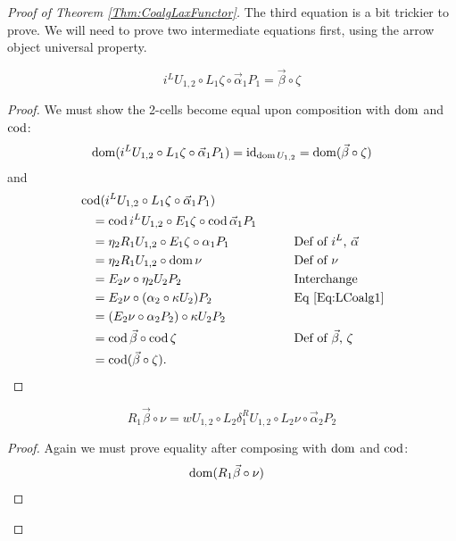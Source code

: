 \begin{proof}[Proof of Theorem \ref{Thm:CoalgLaxFunctor}]
	The third equation is a bit trickier to prove. We will need to prove two intermediate equations first, using the arrow object universal property.
	\begin{lemma*}
		\begin{equation}\label{Eq:CompLem1}
			i^LU_{1,2} \circ L_1\zeta \circ \vec{\alpha}_1P_1 = \vec{\beta}\circ\zeta
		\end{equation}
	\end{lemma*}
	\begin{proof}
		We must show the 2-cells become equal upon composition with $\operatorname{dom}$ and $\operatorname{cod}$:
		\[
			\operatorname{dom}(i^LU_{1,2} \circ L_1\zeta \circ \vec{\alpha}_1P_1) = \operatorname{id}_{\operatorname{dom} U_{1,2}} = \operatorname{dom}(\vec{\beta}\circ\zeta)
		\]
		and
		\begin{alignat*}{2}
			\hspace{1em}&\hspace{-1em} \operatorname{cod}(i^L U_{1,2} \circ L_1\zeta \circ \vec{\alpha}_1P_1) && \\
			&= \operatorname{cod} i^LU_{1,2} \circ E_1\zeta \circ \operatorname{cod}\vec{\alpha}_1P_1 &\qquad& \\
			&= \eta_2R_1U_{1,2} \circ E_1\zeta \circ \alpha_1P_1 
				&& \text{Def of $i^L$, $\vec{\alpha}$} \\
			&= \eta_2R_1U_{1,2} \circ \operatorname{dom}\nu
				&& \text{Def of $\nu$} \\
			&= E_2\nu \circ \eta_2U_2P_2
				&& \text{Interchange} \\
			&= E_2\nu \circ (\alpha_2 \circ \kappa U_2)P_2
				&& \text{Eq \eqref{Eq:LCoalg1}} \\
			&= (E_2\nu \circ \alpha_2P_2) \circ \kappa U_2P_2 && \\
			&= \operatorname{cod}\vec{\beta} \circ \operatorname{cod}\zeta
				&& \text{Def of $\vec{\beta}$, $\zeta$} \\
			&= \operatorname{cod}(\vec{\beta}\circ\zeta). &&
		\end{alignat*}
	\end{proof}
	\begin{lemma*}
		\begin{equation}\label{Eq:CompLem2}
			R_1\vec{\beta} \circ \nu = wU_{1,2} \circ L_2\delta_1^RU_{1,2} \circ L_2\nu \circ \vec{\alpha}_2P_2
		\end{equation}
	\end{lemma*}
	\begin{proof}
		Again we must prove equality after composing with $\operatorname{dom}$ and $\operatorname{cod}$:
		\begin{alignat*}{2}
			\hspace{1em}&\hspace{-1em} \dom(R_1\vec{\beta} \circ \nu) && \\

\end{alignat*}
\end{proof}
\end{proof}
